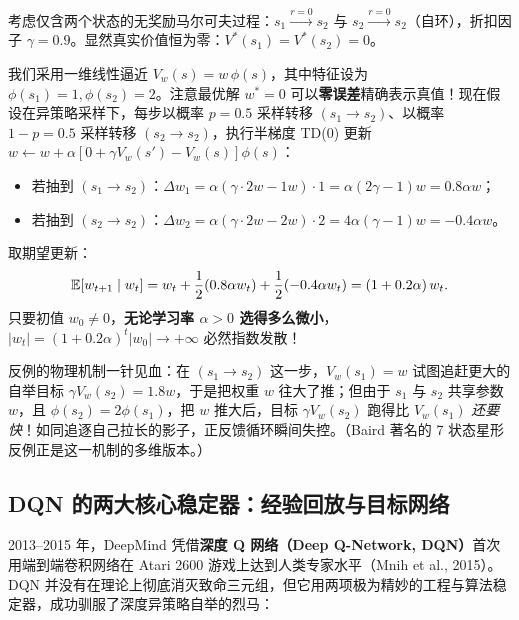 \begin{thmBox}
\begin{example}
\label{ex:deadly-triad}
考虑仅含两个状态的无奖励马尔可夫过程：$s_1 \xrightarrow{r=0} s_2$ 与 $s_2 \xrightarrow{r=0} s_2$（自环），折扣因子 $\gamma = 0.9$。显然真实价值恒为零：$V^*(s_1) = V^*(s_2) = 0$。

我们采用一维线性逼近 $V_w(s) = w\,\phi(s)$，其中特征设为 $\phi(s_1) = 1, \phi(s_2) = 2$。注意最优解 $w^* = 0$ 可以\textbf{零误差}精确表示真值！现在假设在异策略采样下，每步以概率 $p = 0.5$ 采样转移 $(s_1 \to s_2)$、以概率 $1-p = 0.5$ 采样转移 $(s_2 \to s_2)$，执行半梯度 TD(0) 更新 $w \leftarrow w + \alpha [0 + \gamma V_w(s') - V_w(s)] \phi(s)$：
\begin{itemize}
  \item 若抽到 $(s_1 \to s_2)$：$\Delta w_1 = \alpha(\gamma \cdot 2w - 1w)\cdot 1 = \alpha(2\gamma - 1) w = 0.8\alpha w$；
  \item 若抽到 $(s_2 \to s_2)$：$\Delta w_2 = \alpha(\gamma \cdot 2w - 2w)\cdot 2 = 4\alpha(\gamma - 1) w = -0.4\alpha w$。
\end{itemize}
取期望更新：
\[
  \mathbb{E}[w_{t+1} \mid w_t] = w_t + \frac{1}{2}(0.8\alpha w_t) + \frac{1}{2}(-0.4\alpha w_t) = (1 + 0.2\alpha)\, w_t.
\]
只要初值 $w_0 \neq 0$，\textbf{无论学习率 $\alpha > 0$ 选得多么微小}，$|w_t| = (1 + 0.2\alpha)^t |w_0| \to +\infty$ 必然指数发散！
\end{example}
\end{thmBox}

反例的物理机制一针见血：在 $(s_1 \to s_2)$ 这一步，$V_w(s_1) = w$ 试图追赶更大的自举目标 $\gamma V_w(s_2) = 1.8w$，于是把权重 $w$ 往大了推；但由于 $s_1$ 与 $s_2$ 共享参数 $w$，且 $\phi(s_2) = 2\phi(s_1)$，把 $w$ 推大后，目标 $\gamma V_w(s_2)$ 跑得比 $V_w(s_1)$ \emph{还要快}！如同追逐自己拉长的影子，正反馈循环瞬间失控。（Baird 著名的 7 状态星形反例正是这一机制的多维版本。）

\subsection{DQN 的两大核心稳定器：经验回放与目标网络}

2013--2015 年，DeepMind 凭借\textbf{深度 Q 网络（Deep Q-Network, DQN）}首次用端到端卷积网络在 Atari 2600 游戏上达到人类专家水平（Mnih et al., 2015）。DQN 并没有在理论上彻底消灭致命三元组，但它用两项极为精妙的工程与算法稳定器，成功驯服了深度异策略自举的烈马：

